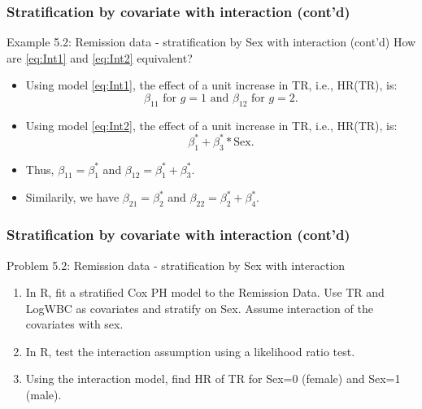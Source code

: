 \documentclass{beamer}
\theoremstyle{definition}
\begin{document}
\begin{frame}
\frametitle{Stratification by covariate with interaction (cont'd)}
\begin{block}{Example 5.2: Remission data - stratification by Sex with interaction (cont'd)}
How are \eqref{eq:Int1} and \eqref{eq:Int2} equivalent?
\begin{itemize}
\item Using model \eqref{eq:Int1}, the effect of a unit increase in TR, i.e., HR(TR), is:
\[ \beta_{11} \text{ for } g=1 \text{ and }  \beta_{12} \text{ for } g=2.
\]
\item Using model \eqref{eq:Int2}, the effect of a unit increase in TR, i.e., HR(TR), is:
\[
\beta_{1}^* + \beta_{3}^**\text{Sex}.
\]
\item Thus, $\beta_{11}=\beta_{1}^*$ and  $\beta_{12}=\beta_{1}^*+\beta_{3}^*$.
\item Similarily, we have $\beta_{21}=\beta_{2}^*$ and  $\beta_{22}=\beta_{2}^*+\beta_{4}^*$.
\end{itemize}
\end{block}
\end{frame}

\begin{frame} 
\frametitle{Stratification by covariate with interaction (cont'd)}
\begin{block}{Problem 5.2: Remission data - stratification by Sex with interaction}
\begin{enumerate}
\item In R, fit a stratified Cox PH model to the Remission Data. Use TR and LogWBC as covariates and stratify on Sex. Assume interaction of the covariates with sex.
\item In R, test the interaction assumption using a likelihood ratio test.  
\item Using the interaction model, find HR of TR for Sex=0 (female) and Sex=1 (male). 
\end{enumerate} 
\end{block} 
\end{frame} 
\end{document}
